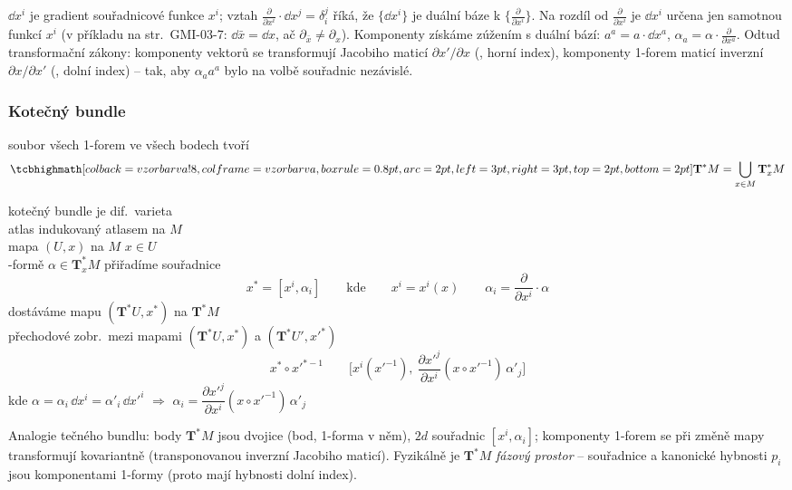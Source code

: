 \begin{vysvetleni}
$\dd x^i$ je gradient souřadnicové funkce $x^i$; vztah $\frac{\partial}{\partial x^i}\cdot\dd x^j=\delta^j_i$ říká, že $\{\dd x^i\}$ je duální báze k $\{\frac{\partial}{\partial x^i}\}$. Na rozdíl od $\frac{\partial}{\partial x^i}$ je $\dd x^i$ určena jen samotnou funkcí $x^i$ (v příkladu na str.~GMI-03-7: $\dd\bar x=\dd x$, ač $\partial_{\bar x}\neq\partial_x$). Komponenty získáme zúžením s duální bází: $a^a=a\cdot\dd x^a$, $\alpha_a=\alpha\cdot\frac{\partial}{\partial x^a}$. Odtud transformační zákony: komponenty vektorů se transformují Jacobiho maticí $\partial x'/\partial x$ (, horní index), komponenty 1-forem maticí inverzní $\partial x/\partial x'$ (, dolní index) -- tak, aby $\alpha_a a^a$ bylo na volbě souřadnic nezávislé.
\end{vysvetleni}

\subsubsection*{Kotečný bundle}
\begin{definice}
soubor všech 1-forem ve všech bodech tvoří 
\[
  \vzorec{\mathbf{T}^*M = \bigcup_{x\in M}\mathbf{T}^*_xM}
\]
\end{definice}

kotečný bundle je dif.\ varieta \\
\quad atlas indukovaný atlasem na $M$ \\
\quad mapa $(U,x)$ na $M$ \qquad $x\in U$ \\
-formě $\alpha\in\mathbf{T}^*_xM$ přiřadíme souřadnice
\[
  x^* = [x^i, \alpha_i] \qquad\text{kde}\qquad x^i = x^i(x) \qquad \alpha_i = \frac{\partial}{\partial x^i}\cdot\alpha
\]
\quad dostáváme mapu $(\mathbf{T}^*U, x^*)$ na $\mathbf{T}^*M$ \\
\quad přechodové zobr.\ mezi mapami $(\mathbf{T}^*U,x^*)$ a $(\mathbf{T}^*U',x'^*)$
\[
  x^*\circ x'^{*-1} \qquad \Big[x^i(x'^{-1}),\ \frac{\partial x'^j}{\partial x^i}(x\circ x'^{-1})\,\alpha'_j\Big]
\]
\quad kde \quad $\alpha = \alpha_i\,\dd x^i = \alpha'_i\,\dd x'^i$ \quad $\Rightarrow$ \quad
$\alpha_i = \dfrac{\partial x'^j}{\partial x^i}(x\circ x'^{-1})\,\alpha'_j$

\begin{vysvetleni}
Analogie tečného bundlu: body $\mathbf{T}^*M$ jsou dvojice (bod, 1-forma v něm), $2d$ souřadnic $[x^i,\alpha_i]$; komponenty 1-forem se při změně mapy transformují kovariantně (transponovanou inverzní Jacobiho maticí). Fyzikálně je $\mathbf{T}^*M$ \emph{fázový prostor} -- souřadnice a kanonické hybnosti $p_i$ jsou komponentami 1-formy (proto mají hybnosti dolní index).
\end{vysvetleni}

